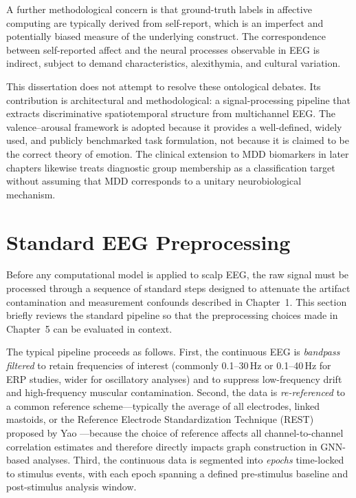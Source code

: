 A further methodological concern is that ground-truth labels in affective computing are typically derived from self-report, which is an imperfect and potentially biased measure of the underlying construct. The correspondence between self-reported affect and the neural processes observable in EEG is indirect, subject to demand characteristics, alexithymia, and cultural variation.

This dissertation does not attempt to resolve these ontological debates. Its contribution is architectural and methodological: a signal-processing pipeline that extracts discriminative spatiotemporal structure from multichannel EEG. The valence--arousal framework is adopted because it provides a well-defined, widely used, and publicly benchmarked task formulation, not because it is claimed to be the correct theory of emotion. The clinical extension to MDD biomarkers in later chapters likewise treats diagnostic group membership as a classification target without assuming that MDD corresponds to a unitary neurobiological mechanism.


\section{Standard EEG Preprocessing}
\label{sec:preprocessing}

Before any computational model is applied to scalp EEG, the raw signal must be processed through a sequence of standard steps designed to attenuate the artifact contamination and measurement confounds described in Chapter~1. This section briefly reviews the standard pipeline so that the preprocessing choices made in Chapter~5 can be evaluated in context.

The typical pipeline proceeds as follows. First, the continuous EEG is \emph{bandpass filtered} to retain frequencies of interest (commonly 0.1--30\,Hz or 0.1--40\,Hz for ERP studies, wider for oscillatory analyses) and to suppress low-frequency drift and high-frequency muscular contamination. Second, the data is \emph{re-referenced} to a common reference scheme---typically the average of all electrodes, linked mastoids, or the Reference Electrode Standardization Technique (REST) proposed by Yao \cite{yao_2001}---because the choice of reference affects all channel-to-channel correlation estimates and therefore directly impacts graph construction in GNN-based analyses. Third, the continuous data is segmented into \emph{epochs} time-locked to stimulus events, with each epoch spanning a defined pre-stimulus baseline and post-stimulus analysis window.

